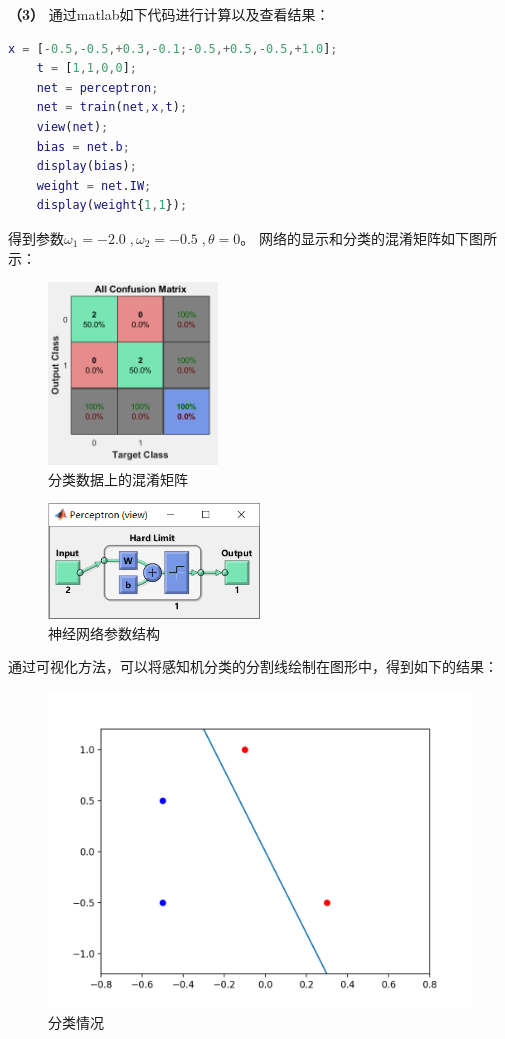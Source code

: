 \documentclass[12pt]{article}
\begin{document}
\textbf{（3）}
通过matlab如下代码进行计算以及查看结果：
\begin{lstlisting}[language=matlab]
    x = [-0.5,-0.5,+0.3,-0.1;-0.5,+0.5,-0.5,+1.0];
    t = [1,1,0,0];
    net = perceptron;
    net = train(net,x,t);
    view(net);
    bias = net.b;
    display(bias);
    weight = net.IW;
    display(weight{1,1});
\end{lstlisting}
得到参数$\omega_1=-2.0\;,\omega_2=-0.5\;,\theta=0$。
网络的显示和分类的混淆矩阵如下图所示：
\begin{figure}[h]
    \centering
    \includegraphics[width=0.4\textwidth]{pic2.png}
    \caption{分类数据上的混淆矩阵}
\end{figure}
\begin{figure}[htbp!]
    \centering
    \includegraphics[width=0.5\textwidth]{pic3.png}
    \caption{神经网络参数结构}
\end{figure}
\newpage
通过可视化方法，可以将感知机分类的分割线绘制在图形中，得到如下的结果：
\begin{figure}[h]
    \centering
    \includegraphics[width=1.0\textwidth]{pic4.png}
    \caption{分类情况}
\end{figure}
\end{document}
